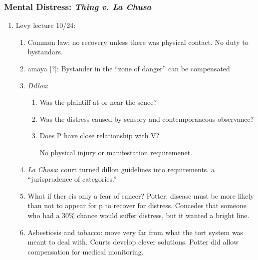 \subsubsection{Mental Distress: \emph{Thing v. La Chusa}}

\begin{enumerate}
    \item Levy lecture 10/24: %
    \begin{enumerate}
        \item Common law: no recovery unless there was physical contact. No duty to bystandars.
        \item amaya [?]: Bystander in the ``zone of danger'' can be compensated
        \item \emph{Dillon}:
        \begin{enumerate}
            \item Was the plaintiff at or near the scnee?
            \item Was the distress caused by sensory and contemporaneous observance?
            \item Does P have close relationship with V?
            \item [No physical injury or manifestation requiremenet.]
        \end{enumerate}
        \item \emph{La Chusa}: court turned dillon guidelines into requirements. a ``jurisprudence of categories.''
        \item What if ther eis only a fear of cancer? Potter: disease must be more likely than not to appear for p to recover for distress. Concedes that someone who had a 30\% chance would suffer distress, but it wanted a bright line.
        \item Asbestiosis and tobacco: move very far from what the tort system was meant to deal with. Courts develop clever solutions. Potter did allow compensation for medical monitoring.
    \end{enumerate}


\end{enumerate}
